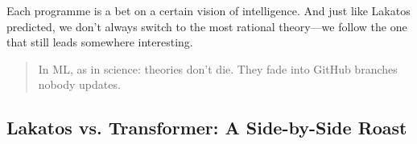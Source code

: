 \bigskip

Each programme is a bet on a certain vision of intelligence. And just like Lakatos predicted, we don’t always switch to the most rational theory—we follow the one that still leads somewhere interesting.

\begin{quote}
In ML, as in science: theories don’t die.  
They fade into GitHub branches nobody updates.
\end{quote}


\subsection*{Lakatos vs. Transformer: A Side-by-Side Roast}

\vspace{1em}

